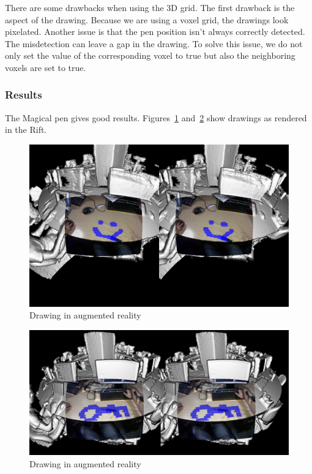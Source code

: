 \documentclass[12pt]{article}
\begin{document}
There are some drawbacks when using the 3D grid. The first drawback is the aspect of the drawing. Because we are using a voxel grid, the drawings look pixelated. Another issue is that the pen position isn't always correctly detected. The misdetection can leave a gap in the drawing. To solve this issue, we do not only set the value of the corresponding voxel to true but also the neighboring voxels are set to true.

\subsubsection{Results}
The Magical pen gives good results. Figures~\ref{fig:pen1} and~\ref{fig:pen2} show drawings as rendered in the Rift.
\begin{figure}[!h]
  \centering
  \includegraphics[scale=0.3]{pen1.png}
  \caption{\label{fig:pen1} Drawing in augmented reality}
\end{figure}

\begin{figure}[!h]
  \centering
  \includegraphics[scale=0.3]{pen2.png}
  \caption{\label{fig:pen2} Drawing in augmented reality}
\end{figure}
\end{document}
